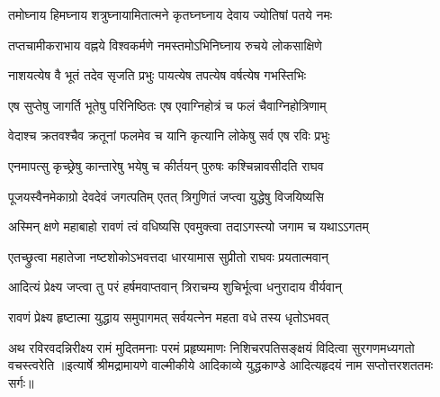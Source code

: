 \twolineshloka
{तमोघ्नाय हिमघ्नाय शत्रुघ्नायामितात्मने}
{कृतघ्नघ्नाय देवाय ज्योतिषां पतये नमः}

\twolineshloka
{तप्तचामीकराभाय वह्नये विश्वकर्मणे}
{नमस्तमोऽभिनिघ्नाय रुचये लोकसाक्षिणे}

\twolineshloka
{नाशयत्येष वै भूतं तदेव सृजति प्रभुः}
{पायत्येष तपत्येष वर्षत्येष गभस्तिभिः}

\twolineshloka
{एष सुप्तेषु जागर्ति भूतेषु परिनिष्ठितः}
{एष एवाग्निहोत्रं च फलं चैवाग्निहोत्रिणाम्}

\twolineshloka
{वेदाश्च क्रतवश्चैव क्रतूनां फलमेव च}
{यानि कृत्यानि लोकेषु सर्व एष रविः प्रभुः}

\twolineshloka
{एनमापत्सु कृच्छ्रेषु कान्तारेषु भयेषु च}
{कीर्तयन् पुरुषः कश्चिन्नावसीदति राघव}

\twolineshloka
{पूजयस्वैनमेकाग्रो देवदेवं जगत्पतिम्}
{एतत् त्रिगुणितं जप्त्वा युद्धेषु विजयिष्यसि}

\twolineshloka
{अस्मिन् क्षणे महाबाहो रावणं त्वं वधिष्यसि}
{एवमुक्त्वा तदाऽगस्त्यो जगाम च यथाऽऽगतम्}

\twolineshloka
{एतच्छ्रुत्वा महातेजा नष्टशोकोऽभवत्तदा}
{धारयामास सुप्रीतो राघवः प्रयतात्मवान्}

\twolineshloka
{आदित्यं प्रेक्ष्य जप्त्वा तु परं हर्षमवाप्तवान्}
{त्रिराचम्य शुचिर्भूत्वा धनुरादाय वीर्यवान्}

\twolineshloka
{रावणं प्रेक्ष्य हृष्टात्मा युद्धाय समुपागमत्}
{सर्वयत्नेन महता वधे तस्य धृतोऽभवत्}

\twolineshloka
{अथ रविरवदन्निरीक्ष्य रामं मुदितमनाः परमं प्रहृष्यमाणः}
{निशिचरपतिसङ्क्षयं विदित्वा सुरगणमध्यगतो वचस्त्वरेति}
॥इत्यार्षे श्रीमद्रामायणे वाल्मीकीये आदिकाव्ये युद्धकाण्डे आदित्यहृदयं नाम सप्तोत्तरशततमः सर्गः॥